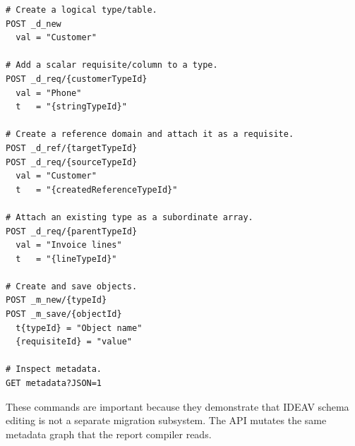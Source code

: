 \documentclass[11pt]{article}
\begin{document}
\begin{verbatim}
# Create a logical type/table.
POST _d_new
  val = "Customer"

# Add a scalar requisite/column to a type.
POST _d_req/{customerTypeId}
  val = "Phone"
  t   = "{stringTypeId}"

# Create a reference domain and attach it as a requisite.
POST _d_ref/{targetTypeId}
POST _d_req/{sourceTypeId}
  val = "Customer"
  t   = "{createdReferenceTypeId}"

# Attach an existing type as a subordinate array.
POST _d_req/{parentTypeId}
  val = "Invoice lines"
  t   = "{lineTypeId}"

# Create and save objects.
POST _m_new/{typeId}
POST _m_save/{objectId}
  t{typeId} = "Object name"
  {requisiteId} = "value"

# Inspect metadata.
GET metadata?JSON=1
\end{verbatim}

These commands are important because they demonstrate that IDEAV schema editing
is not a separate migration subsystem. The API mutates the same metadata graph
that the report compiler reads.



\end{document}

